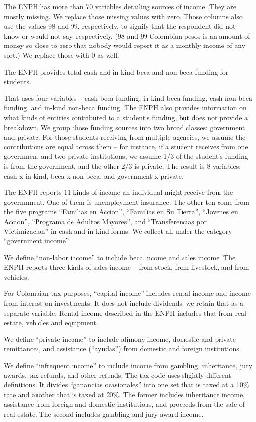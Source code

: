 \documentclass[12pt]{article}
\begin{document}
\begin{appendices}
The ENPH has more than 70 variables detailing sources of income.
They are mostly missing.
We replace those missing values with zero.
Those columns also use the values 98 and 99, respectively,
to signify that the respondent did not know or would not say, respectively.
(98 and 99 Colombian pesos is an amount of money so close to zero
that nobody would report it as a monthly income of any sort.)
We replace those with 0 as well.

The ENPH provides total cash and in-kind beca and non-beca funding for students.
\iffalse
    [[AN ECONOMIST:
        How can I explain the difference between beca and non-beca funding?]]
\fi
That uses four variables --
cash beca funding, in-kind beca funding, cash non-beca funding, and in-kind non-beca funding.
The ENPH also provides information on
what kinds of entities contributed to a student's funding,
but does not provide a breakdown.
We group those funding sources into two broad classes: government and private.
For those students receiving from multiple agencies,
we assume the contributions are equal across them -- for instance,
if a student receives from one government and two private institutions,
we assume 1/3 of the student's funding is from the government,
and the other 2/3 is private.
The result is 8 variables:
cash x in-kind, beca x non-beca, and government x private.

The ENPH reports 11 kinds of income
an individual might receive from the governmnent.
One of them is unemployment insurance.
The other ten come from the five programs
``Familias en Accion'',
``Familias en Su Tierra'',
``Jovenes en Accion'',
``Programa de Adultos Mayores'', and
``Transferencias por Victimizacion''
in cash and in-kind forms.
We collect all under the category ``government income''.

We define ``non-labor income'' to include beca income and sales income.
The ENPH reports three kinds of sales income --
from stock, from livestock, and from vehicles.

For Colombian tax purposes, ``capital income''
includes rental income and income from interest on investments.
It does not include dividends; we retain that as a separate variable.
Rental income described in the ENPH includes that from
real estate, vehicles and equipment.

We define ``private income'' to include
alimony income, domestic and private remittances, and
assistance (``ayudas'') from domestic and foreign institutions.

We define ``infrequent income'' to include income from
gambling, inheritance, jury awards, tax refunds, and other refunds.
The tax code uses slightly different definitions.
It divides ``ganancias ocasionales'' into
one set that is taxed at a 10\% rate
and another that is taxed at 20\%.
The former includes inheritance income,
assistance from foreign and domestic institutions,
and proceeds from the sale of real estate.
The second includes gambling and jury award income.


\end{appendices}
\end{document}

